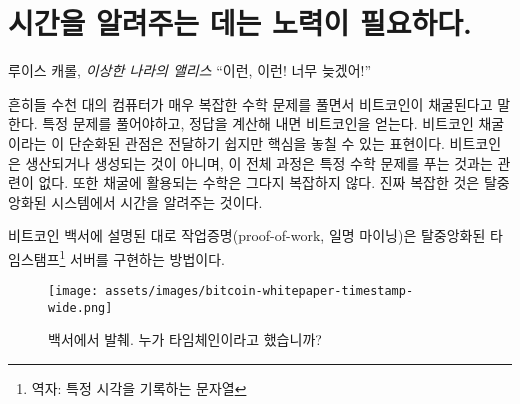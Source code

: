 \chapter{시간을 알려주는 데는 노력이 필요하다.}
\label{les:17}

\begin{chapquote}{루이스 캐롤, \textit{이상한 나라의 앨리스}}
	\enquote{이런, 이런! 너무 늦겠어!}
\end{chapquote}

\begin{comment}
	It is often said that bitcoins are mined because thousands of computers
	work on solving \textit{very complex} mathematical problems. Certain problems
	are to be solved, and if you compute the right answer, you \enquote{produce} a
	bitcoin. While this simplified view of bitcoin mining might be easier to
	convey, it does miss the point somewhat. Bitcoins aren't produced or
	created, and the whole ordeal is not really about solving particular
	math problems. Also, the math isn't particularly complex. What is
	complex is \textit{telling the time} in a decentralized system.
\end{comment}
흔히들 수천 대의 컴퓨터가 매우 복잡한 수학 문제를 풀면서 비트코인이 채굴된다고 말한다.
특정 문제를 풀어야하고, 정답을 계산해 내면 비트코인을 얻는다.
비트코인 채굴이라는 이 단순화된 관점은 전달하기 쉽지만 핵심을 놓칠 수 있는 표현이다.
비트코인은 생산되거나 생성되는 것이 아니며, 이 전체 과정은 특정 수학 문제를 푸는 것과는 관련이 없다.
또한 채굴에 활용되는 수학은 그다지 복잡하지 않다. 
진짜 복잡한 것은 탈중앙화된 시스템에서 시간을 알려주는 것이다.

\begin{comment}
	As outlined in the whitepaper, the proof-of-work system (aka mining) is
	a way to implement a distributed timestamp server.
\end{comment}
비트코인 백서에 설명된 대로 작업증명(proof-of-work, 일명 마이닝)은 탈중앙화된 타임스탬프\footnote{역자: 특정 시각을 기록하는 문자열} 서버를 구현하는 방법이다.

\begin{figure}
	\texttt{[image: assets/images/bitcoin-whitepaper-timestamp-wide.png]}
	\caption{백서에서 발췌. 누가 타임체인이라고 했습니까?}
	\label{fig:bitcoin-whitepaper-timestamp-wide}
\end{figure}

